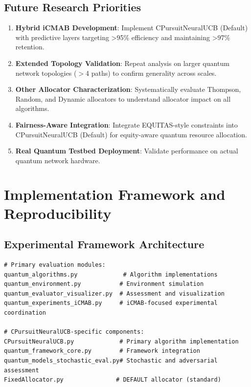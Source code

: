 \documentclass[12pt,a4paper]{article}
\begin{document}
\subsection{Future Research Priorities}

\begin{enumerate}
\item \textbf{Hybrid iCMAB Development}: Implement CPursuitNeuralUCB (Default) with predictive layers targeting >95\% efficiency and maintaining >97\% retention.

\item \textbf{Extended Topology Validation}: Repeat analysis on larger quantum network topologies ($>$4 paths) to confirm generality across scales.

\item \textbf{Other Allocator Characterization}: Systematically evaluate Thompson, Random, and Dynamic allocators to understand allocator impact on all algorithms.

\item \textbf{Fairness-Aware Integration}: Integrate EQUITAS-style constraints into CPursuitNeuralUCB (Default) for equity-aware quantum resource allocation.

\item \textbf{Real Quantum Testbed Deployment}: Validate performance on actual quantum network hardware.
\end{enumerate}

\section{Implementation Framework and Reproducibility}

\subsection{Experimental Framework Architecture}

\begin{lstlisting}[caption=Core Framework Components (Default Allocator)]
# Primary evaluation modules:
quantum_algorithms.py             # Algorithm implementations
quantum_environment.py           # Environment simulation
quantum_evaluator_visualizer.py  # Assessment and visualization
quantum_experiments_iCMAB.py     # iCMAB-focused experimental coordination

# CPursuitNeuralUCB-specific components:
CPursuitNeuralUCB.py             # Primary algorithm implementation
quantum_framework_core.py        # Framework integration
quantum_models_stochastic_eval.py# Stochastic and adversarial assessment
FixedAllocator.py               # DEFAULT allocator (standard)
\end{lstlisting}
\end{document}
